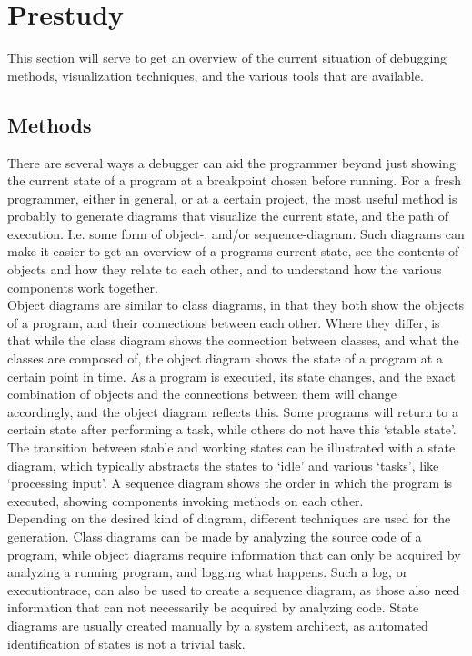 \chapter{Prestudy}\label{prestudy}%
This section will serve to get an overview of the current situation of debugging methods, visualization techniques, and the various tools that are available.
\section{Methods}\label{preMethods}
There are several ways a debugger can aid the programmer beyond just showing the current state of a program at a \gls{breakpoint} chosen before running.
For a fresh programmer, either in general, or at a certain project, the most useful method is probably to generate diagrams that visualize the current state, and the path of execution.
I.e. some form of object-, and/or sequence-diagram.
Such diagrams can make it easier to get an overview of a programs current state, see the contents of objects and how they relate to each other, and to understand how the various components work together.
~\\

Object diagrams are similar to class diagrams, in that they both show the objects of a program, and their connections between each other.
Where they differ, is that while the class diagram shows the connection between classes, and what the classes are composed of, the object diagram shows the state of a program at a certain point in time.
As a program is executed, its state changes, and the exact combination of objects and the connections between them will change accordingly, and the object diagram reflects this.
Some programs will return to a certain state after performing a task, while others do not have this `stable state'.
The transition between stable and working states can be illustrated with a state diagram, which typically abstracts the states to `idle' and various `tasks', like `processing input'.
A sequence diagram shows the order in which the program is executed, showing components invoking methods on each other.
~\\

Depending on the desired kind of diagram, different techniques are used for the generation.
Class diagrams can be made by analyzing the source code of a program, while object diagrams require information that can only be acquired by analyzing a running program, and logging what happens.
Such a log, or \gls{executiontrace}, can also be used to create a sequence diagram, as those also need information that can not necessarily be acquired by analyzing code.
State diagrams are usually created manually by a system architect, as automated identification of states is not a trivial task.
~\\

